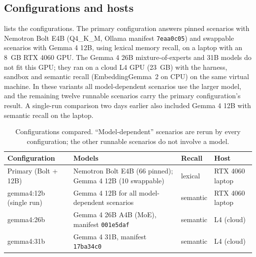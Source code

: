 \documentclass[11pt,a4paper]{article}
\begin{document}
\subsection{Configurations and hosts}
 lists the configurations. The primary configuration answers pinned scenarios with Nemotron Bolt E4B (Q4\_K\_M, Ollama manifest \texttt{7eaa0c05}) and swappable scenarios with Gemma 4 12B, using lexical memory recall, on a laptop with an 8~GB RTX 4060 GPU. The Gemma 4 26B mixture-of-experts and 31B models do not fit this GPU; they ran on a cloud L4 GPU (23~GB) with the harness, sandbox and semantic recall (EmbeddingGemma~2 on CPU) on the same virtual machine. In these variants all model-dependent scenarios use the larger model, and the remaining twelve runnable scenarios carry the primary configuration's result. A single-run comparison two days earlier also included Gemma 4 12B with semantic recall on the laptop.

\begin{table}[tbp]
\caption{Configurations compared. ``Model-dependent'' scenarios are rerun by every configuration; the other runnable scenarios do not involve a model.}\label{tab:configs}
\centering\small
\begin{tabularx}{\linewidth}{P{.25\linewidth}YP{.17\linewidth}P{.13\linewidth}}\toprule
Configuration & Models & Recall & Host\\\midrule
Primary (Bolt + 12B) & Nemotron Bolt E4B (66 pinned); Gemma 4 12B (10 swappable) & lexical & RTX 4060 laptop\\
gemma4:12b (single run) & Gemma 4 12B for all model-dependent scenarios & semantic & RTX 4060 laptop\\
gemma4:26b & Gemma 4 26B A4B (MoE), manifest \texttt{001e5daf} & semantic & L4 (cloud)\\
gemma4:31b & Gemma 4 31B, manifest \texttt{17ba34c0} & semantic & L4 (cloud)\\\bottomrule
\end{tabularx}
\end{table}
\end{document}
